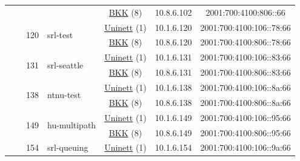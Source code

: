 \begin{small}
\begin{center}
\begin{longtable}{|c|c|c|c|c|c|c|c|}
  &  & \multicolumn{2}{|c|}{} & \multicolumn{2}{|c|}{\tiny{\href{http://bkk.no}{BKK} (8)}} & \tiny{10.8.6.102} & \tiny{2001:700:4100:806::66} \\* \cline{3-3}\cline{4-4}\cline{5-5}\cline{6-6}\cline{7-7}\cline{8-8}
  &  & \multirow{2}{*}{\tiny{120}} & \multicolumn{1}{|l|}{\multirow{2}{*}{\tiny{srl-test}}} & \multicolumn{2}{|c|}{\tiny{\href{https://www.uninett.no}{Uninett} (1)}} & \tiny{10.1.6.120} & \tiny{2001:700:4100:106::78:66} \\* \cline{5-5}\cline{6-6}\cline{7-7}\cline{8-8}
  &  &  &  & \multicolumn{2}{|c|}{\tiny{\href{http://bkk.no}{BKK} (8)}} & \tiny{10.8.6.120} & \tiny{2001:700:4100:806::78:66} \\* \cline{3-3}\cline{4-4}\cline{5-5}\cline{6-6}\cline{7-7}\cline{8-8}
  &  & \multirow{2}{*}{\tiny{131}} & \multicolumn{1}{|l|}{\multirow{2}{*}{\tiny{srl-seattle}}} & \multicolumn{2}{|c|}{\tiny{\href{https://www.uninett.no}{Uninett} (1)}} & \tiny{10.1.6.131} & \tiny{2001:700:4100:106::83:66} \\* \cline{5-5}\cline{6-6}\cline{7-7}\cline{8-8}
  &  &  &  & \multicolumn{2}{|c|}{\tiny{\href{http://bkk.no}{BKK} (8)}} & \tiny{10.8.6.131} & \tiny{2001:700:4100:806::83:66} \\* \cline{3-3}\cline{4-4}\cline{5-5}\cline{6-6}\cline{7-7}\cline{8-8}
  &  & \multirow{2}{*}{\tiny{138}} & \multicolumn{1}{|l|}{\multirow{2}{*}{\tiny{ntnu-test}}} & \multicolumn{2}{|c|}{\tiny{\href{https://www.uninett.no}{Uninett} (1)}} & \tiny{10.1.6.138} & \tiny{2001:700:4100:106::8a:66} \\* \cline{5-5}\cline{6-6}\cline{7-7}\cline{8-8}
  &  &  &  & \multicolumn{2}{|c|}{\tiny{\href{http://bkk.no}{BKK} (8)}} & \tiny{10.8.6.138} & \tiny{2001:700:4100:806::8a:66} \\* \cline{3-3}\cline{4-4}\cline{5-5}\cline{6-6}\cline{7-7}\cline{8-8}
  &  & \multirow{2}{*}{\tiny{149}} & \multicolumn{1}{|l|}{\multirow{2}{*}{\tiny{hu-multipath}}} & \multicolumn{2}{|c|}{\tiny{\href{https://www.uninett.no}{Uninett} (1)}} & \tiny{10.1.6.149} & \tiny{2001:700:4100:106::95:66} \\* \cline{5-5}\cline{6-6}\cline{7-7}\cline{8-8}
  &  &  &  & \multicolumn{2}{|c|}{\tiny{\href{http://bkk.no}{BKK} (8)}} & \tiny{10.8.6.149} & \tiny{2001:700:4100:806::95:66} \\* \cline{3-3}\cline{4-4}\cline{5-5}\cline{6-6}\cline{7-7}\cline{8-8}
  &  & \multirow{2}{*}{\tiny{154}} & \multicolumn{1}{|l|}{\multirow{2}{*}{\tiny{srl-queuing}}} & \multicolumn{2}{|c|}{\tiny{\href{https://www.uninett.no}{Uninett} (1)}} & \tiny{10.1.6.154} & \tiny{2001:700:4100:106::9a:66} \\* \cline{5-5}\cline{6-6}\cline{7-7}\cline{8-8}

\end{longtable}
\end{center}
\end{small}
